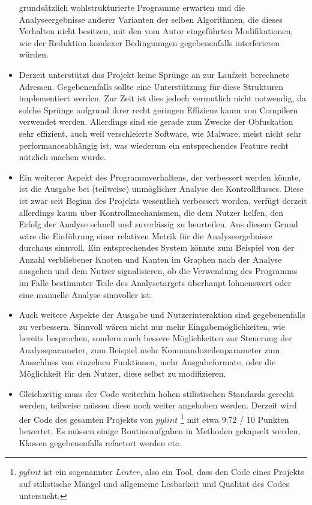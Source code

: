 \documentclass[11pt]{article}
\begin{document}
\begin{itemize}
{		grundsätzlich wohlstrukturierte Programme erwarten und die Analyseergebnisse anderer
		Varianten der selben Algorithmen, die dieses Verhalten nicht besitzen, mit den vom
		Autor eingeführten Modifikationen, wie der Reduktion komlexer Bedinguungen gegebenenfalls
		interferieren würden.
	}
	\item{Derzeit unterstützt das Projekt keine Sprünge an zur Laufzeit berechnete Adressen. Gegebenenfalls
		sollte eine Unterstützung für diese Strukturen implementiert werden. Zur Zeit ist dies
		jedoch vermutlich nicht notwendig, da solche Sprünge aufgrund ihrer recht geringen Effizienz
		kaum von Compilern verwendet werden. Allerdings sind sie gerade zum Zwecke der Obfuskation
		sehr effizient, auch weil verschleierte Software, wie Malware, meist nicht sehr
		performanceabhängig ist, was wiederum ein entsprechendes Feature recht nützlich machen würde.
	}
	\item{Ein weiterer Aspekt des Programmverhaltens, der verbessert werden könnte, ist die Ausgabe bei
		(teilweise) unmöglicher Analyse des Kontrollflusses. Diese ist zwar seit Beginn des Projekts
		wesentlich verbessert worden, verfügt derzeit allerdings kaum über Kontrollmechanismen, die dem
		Nutzer helfen, den Erfolg der Analyse schnell und zuverlässig zu beurteilen. Aus diesem Grund
		wäre die Einführung einer relativen Metrik für die Analyseergebnisse durchaus sinnvoll. Ein
		entsprechendes System könnte zum Beispiel von der Anzahl verbliebener Knoten und Kanten im
		Graphen nach der Analyse ausgehen und dem Nutzer signalisieren, ob die Verwendung des Programms
		im Falle bestimmter Teile des Analysetargets überhaupt lohnenswert oder eine manuelle Analyse
		sinnvoller ist.
	}
	\item{Auch weitere Aspekte der Ausgabe und Nutzerinteraktion sind gegebenenfalls zu verbessern. Sinnvoll
		wären nicht nur mehr Eingabemöglichkeiten, wie bereits besprochen, sondern auch bessere
		Möglichkeiten zur Steuerung der Analyseparameter, zum Beispiel mehr Kommandozeilenparameter
		zum Ausschluss von einzelnen Funktionen, mehr Ausgabeformate, oder die Möglichkeit für den Nutzer,
		diese selbst zu modifizieren.
	}
	\item{Gleichzeitig muss der Code weiterhin hohen stilistischen Standards gerecht werden, teilweise müssen
		diese noch weiter angehoben werden. Derzeit wird der Code des gesamten Projekts von $pylint$
		\footnote{$pylint$ ist ein sogenannter $Linter$, also ein Tool, dass den Code eines Projekts auf
			stilistische Mängel und allgemeine Lesbarkeit und Qualität des Codes untersucht.
		}
		mit etwa 9.72 / 10 Punkten bewertet. Es müssen einige Routineaufgaben in Methoden
		gekapselt werden, Klassen gegebenenfalls refactort werden etc.
	}
\end{itemize}
\end{document}
